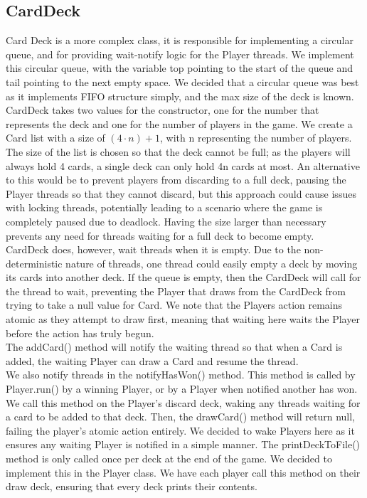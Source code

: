 \documentclass[11p]{article}
\begin{document}
\subsection{CardDeck}
Card Deck is a more complex class, it is responsible for implementing a circular queue, and for providing wait-notify logic for the Player threads.
We implement this circular queue, with the variable top pointing to the start of the queue and tail pointing to the next empty space. We decided that a circular queue was best as it implements FIFO structure simply, and the max size of the deck is known. \\
CardDeck takes two values for the constructor, one for the number that represents the deck and one for the number of players in the game. We create a Card list with a size of $(4 \cdot n) + 1$, with n representing the number of players. The size of the list is chosen so that the deck cannot be full; as the players will always hold 4 cards, a single deck can only hold 4n cards at most. 
An alternative to this would be to prevent players from discarding to a full deck, pausing the Player threads so that they cannot discard, but this approach could cause issues with locking threads, potentially leading to a scenario where the game is completely paused due to deadlock.
Having the size larger than necessary prevents any need for threads waiting for a full deck to become empty. \\
CardDeck does, however, wait threads when it is empty. Due to the non-deterministic nature of threads, one thread could easily empty a deck by moving its cards into another deck.
If the queue is empty, then the CardDeck will call for the thread to wait, preventing the Player that draws from the CardDeck from trying to take a null value for Card. We note that the Players action remains atomic as they attempt to draw first, meaning that waiting here waits the Player before the action has truly begun.\\
The addCard() method will notify the waiting thread so that when a Card is added, the waiting Player can draw a Card and resume the thread. \\
We also notify threads in the notifyHasWon() method. This method is called by Player.run() by a winning Player, or by a Player when notified another has won. We call this method on the Player's discard deck, waking any threads waiting for a card to be added to that deck. Then, the drawCard() method will return null, failing the player's atomic action entirely. We decided to wake Players here as it ensures any waiting Player is notified in a simple manner.
The printDeckToFile() method is only called once per deck at the end of the game. We decided to implement this in the Player class. We have each player call this method on their draw deck, ensuring that every deck prints their contents.
\end{document}
